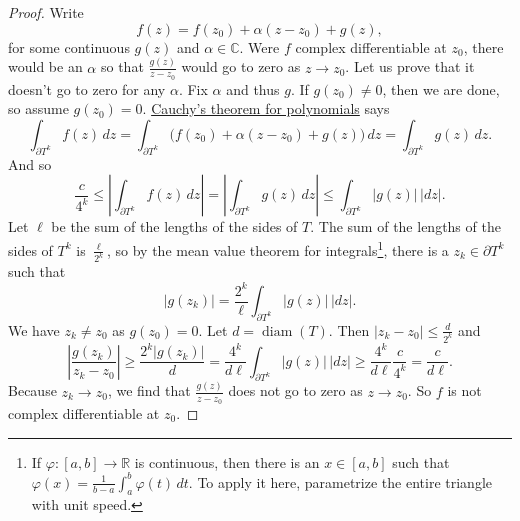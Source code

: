 \documentclass[12pt,openany]{book}
\newcommand{\sabs}[1]{\lvert {#1} \rvert}
\newcommand{\abs}[1]{\left\lvert {#1} \right\rvert}
\newcommand{\C}{{\mathbb{C}}}
\newcommand{\R}{{\mathbb{R}}}
\theoremstyle{plain}
\theoremstyle{remark}
\theoremstyle{definition}
\theoremstyle{exercise}
\theoremstyle{example}
\begin{document}
\begin{proof}
Write
\begin{equation*}
f(z) = f(z_0) + \alpha (z-z_0) + g(z) ,
\end{equation*}
for some continuous $g(z)$ and $\alpha \in \C$.
Were $f$ complex differentiable at $z_0$, there would be an $\alpha$ so that
$\frac{g(z)}{z-z_0}$ would go to zero as $z \to z_0$.
Let us prove that it doesn't go to zero for any $\alpha$.  Fix $\alpha$
and thus $g$.  If $g(z_0) \not= 0$,
then we are done, so assume $g(z_0) = 0$.
\hyperref[cor:cauchyforpoly]{Cauchy's theorem for polynomials} says
\begin{equation*}
\int_{\partial T^k} f(z) \, dz =
\int_{\partial T^k} \bigl( f(z_0) + \alpha (z-z_0) + g(z) \bigr) \, dz =
\int_{\partial T^k} g(z) \, dz .
\end{equation*}
And so
\begin{equation*}
\frac{c}{4^k} \leq
\abs{
\int_{\partial T^k} f(z) \, dz
} =
\abs{
\int_{\partial T^k} g(z) \, dz 
}
\leq
\int_{\partial T^k} \sabs{g(z)} \, \sabs{dz} .
\end{equation*}
Let $\ell$ be the sum of the lengths of the sides of $T$.
The sum of the lengths of the sides of $T^k$ is
$\frac{\ell}{2^k}$, so
by the mean value theorem for integrals\footnote{%
If $\varphi \colon [a,b] \to \R$ is continuous, then there is an $x \in [a,b]$
such that $\varphi(x) = \frac{1}{b-a} \int_a^b \varphi(t) \, dt$.
To apply it here, parametrize the entire triangle with unit speed.},
there is a $z_k \in \partial T^k$ such that
\begin{equation*}
\sabs{g(z_k)} = 
\frac{2^k}{\ell}
\int_{\partial T^k} \sabs{g(z)} \, \sabs{dz} .
\end{equation*}
We have $z_k \not= z_0$ as $g(z_0)=0$.
Let $d = \operatorname{diam}(T)$.  Then
$\sabs{z_k-z_0} \leq \frac{d}{2^k}$ and
\begin{equation*}
\abs{\frac{g(z_k)}{z_k-z_0}}
\geq
\frac{2^k\sabs{g(z_k)}}{d}
=
\frac{4^k}{d \ell}
\int_{\partial T^k} \sabs{g(z)} \, \sabs{dz}
\geq
\frac{4^k}{d \ell}
\frac{c}{4^k} = \frac{c}{d \ell} .
\end{equation*}
Because $z_k \to z_0$, we find that $\frac{g(z)}{z-z_0}$ does not 
go to zero as $z \to z_0$.  So $f$ is not complex differentiable at $z_0$.
\end{proof}
\end{document}
